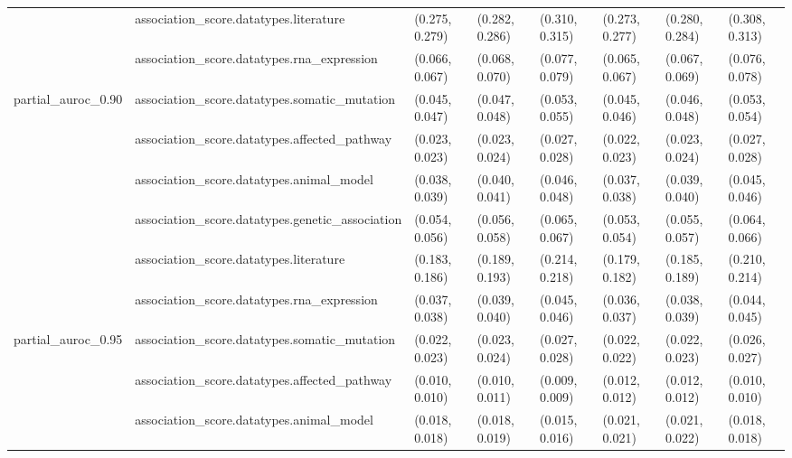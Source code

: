 \begin{table}[H]
{\begin{tabular}{llllllll}
 & association\_score.datatypes.literature & (0.275, 0.279) & (0.282, 0.286) & (0.310, 0.315) & (0.273, 0.277) & (0.280, 0.284) & (0.308, 0.313)\\

 & association\_score.datatypes.rna\_expression & (0.066, 0.067) & (0.068, 0.070) & (0.077, 0.079) & (0.065, 0.067) & (0.067, 0.069) & (0.076, 0.078)\\

\multirow{-6}{*}{\raggedright\arraybackslash partial\_auroc\_0.90} & association\_score.datatypes.somatic\_mutation & (0.045, 0.047) & (0.047, 0.048) & (0.053, 0.055) & (0.045, 0.046) & (0.046, 0.048) & (0.053, 0.054)\\
\cmidrule{1-8}
 & association\_score.datatypes.affected\_pathway & (0.023, 0.023) & (0.023, 0.024) & (0.027, 0.028) & (0.022, 0.023) & (0.023, 0.024) & (0.027, 0.028)\\

 & association\_score.datatypes.animal\_model & (0.038, 0.039) & (0.040, 0.041) & (0.046, 0.048) & (0.037, 0.038) & (0.039, 0.040) & (0.045, 0.046)\\

 & association\_score.datatypes.genetic\_association & (0.054, 0.056) & (0.056, 0.058) & (0.065, 0.067) & (0.053, 0.054) & (0.055, 0.057) & (0.064, 0.066)\\

 & association\_score.datatypes.literature & (0.183, 0.186) & (0.189, 0.193) & (0.214, 0.218) & (0.179, 0.182) & (0.185, 0.189) & (0.210, 0.214)\\

 & association\_score.datatypes.rna\_expression & (0.037, 0.038) & (0.039, 0.040) & (0.045, 0.046) & (0.036, 0.037) & (0.038, 0.039) & (0.044, 0.045)\\

\multirow{-6}{*}{\raggedright\arraybackslash partial\_auroc\_0.95} & association\_score.datatypes.somatic\_mutation & (0.022, 0.023) & (0.023, 0.024) & (0.027, 0.028) & (0.022, 0.022) & (0.022, 0.023) & (0.026, 0.027)\\
\cmidrule{1-8}
 & association\_score.datatypes.affected\_pathway & (0.010, 0.010) & (0.010, 0.011) & (0.009, 0.009) & (0.012, 0.012) & (0.012, 0.012) & (0.010, 0.010)\\

 & association\_score.datatypes.animal\_model & (0.018, 0.018) & (0.018, 0.019) & (0.015, 0.016) & (0.021, 0.021) & (0.021, 0.022) & (0.018, 0.018)\\


\end{tabular}}
\end{table}
